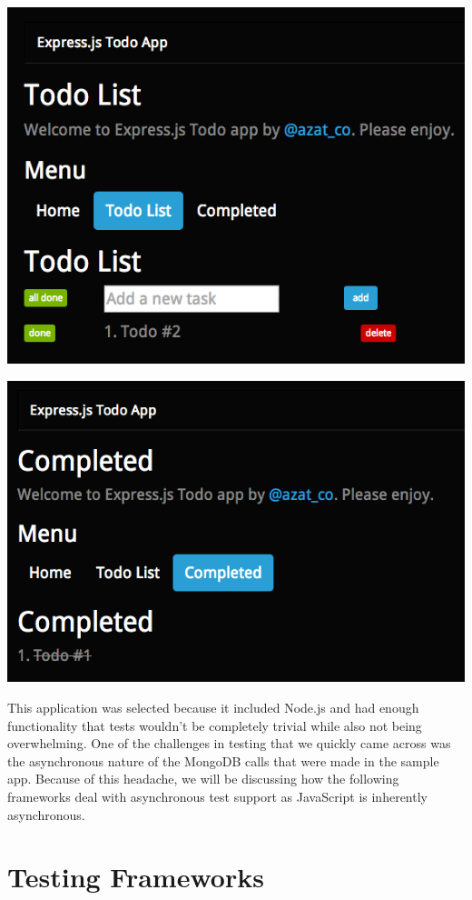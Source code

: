 \documentclass[11pt]{article}
\newenvironment{Figure}
  {\par\medskip\noindent\minipage{\linewidth}}
  {\endminipage\par\medskip}
\begin{document}
\begin{Figure}
  \centering
  \includegraphics[width=0.75\linewidth]{todo_some_tasks.png}
\end{Figure}

\begin{Figure}
  \centering
  \includegraphics[width=0.75\linewidth]{todo_completed.png}
\end{Figure}

This application was selected because it included Node.js and had enough functionality that tests wouldn't be completely trivial while also not being overwhelming.
One of the challenges in testing that we quickly came across was the asynchronous nature of the MongoDB calls that were made in the sample app. Because of this headache, we will be discussing how the following frameworks deal with asynchronous test support as JavaScript is inherently asynchronous.

\section{Testing Frameworks}
\end{document}
